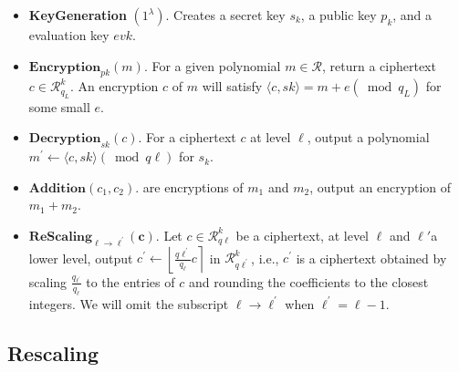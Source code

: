 \documentclass{article}
\begin{document}
\begin{itemize}
    \item \textbf{KeyGeneration} $\left(1^\lambda\right)$. Creates a secret key $s_k$, a public key $p_k$, and a evaluation key $evk$.
    
    \item $\textbf{Encryption}_{pk}(m)$. For a given polynomial $m \in \mathcal{R}$, return a ciphertext $c \in \mathcal{R}_{q_L}^k$. An encryption $c$ of $m$ will satisfy $\langle c, s k\rangle=m+e\left(\bmod q_L\right)$ for some small $e$. 
    
    
    \item $\textbf{Decryption}_{sk}(c)$. For a ciphertext $c$ at level $\ell$, output a polynomial $m^{\prime} \leftarrow\langle c, s k\rangle\left(\bmod q{\ell}\right)$ for $s_k$.
    
    \item $\textbf{Addition}\left(c_1, c_2\right)$. are encryptions of $m_1$ and $m_2$, output an encryption of $m_1+m_2$. 
    

    \item $\textbf{ReScaling}_{\ell \rightarrow \ell^{\prime}}(\mathbf{c})$. Let $c \in \mathcal{R}_{q{\ell}}^k$ be a ciphertext, at level $\ell$ and $\ell '$a lower level, output $c^{\prime} \leftarrow\left\lfloor\frac{q{\ell^{\prime}}}{q_{\ell}} c\right\rceil$ in $\mathcal{R}_{q{\ell^{\prime}}}^k$, i.e., $c^{\prime}$ is a ciphertext obtained by scaling $\frac{q_{\ell^{\prime}}}{q_{\ell}}$ to the entries of $c$ and rounding the coefficients to the closest integers. We will omit the subscript $\ell \rightarrow \ell^{\prime}$ when $\ell^{\prime}=\ell-1$.
\end{itemize}


\subsection{Rescaling}
\end{document}

